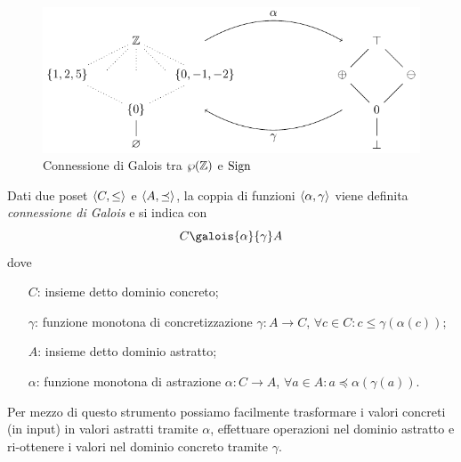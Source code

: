 \begin{figure}[htbp]
    \centering
    \includegraphics{capitoli/interpretazione-astratta/immagini/reticolo-segni.pdf}
    \caption{Connessione di Galois tra $\wp(\mathbb{Z})$ e $\mathrm{Sign}$}
    \label{fig:sign}
\end{figure}

\begin{definition}
Dati due poset $\langle C, \le \rangle$ e $\langle A, \preceq \rangle$, la coppia di funzioni $\langle \alpha, \gamma \rangle$ viene definita \emph{connessione di Galois} e si indica con 
\[ C \galois{\alpha}{\gamma} A \]
dove
\begin{itemize}
    \item[$C$:] insieme detto dominio concreto;
    \item[$\gamma$:] funzione monotona di concretizzazione $\gamma : A \to C$, $\forall c \in C : c \le \gamma(\alpha(c))$;
    \item[$A$:] insieme detto dominio astratto;
    \item[$\alpha$:] funzione monotona di astrazione $\alpha : C \to A$, $\forall a \in A : a \preceq \alpha(\gamma(a))$.
\end{itemize}
\end{definition}

Per mezzo di questo strumento possiamo facilmente trasformare i valori concreti (in input) in valori astratti tramite $\alpha$, effettuare operazioni nel dominio astratto e ri-ottenere i valori nel dominio concreto tramite $\gamma$. 


